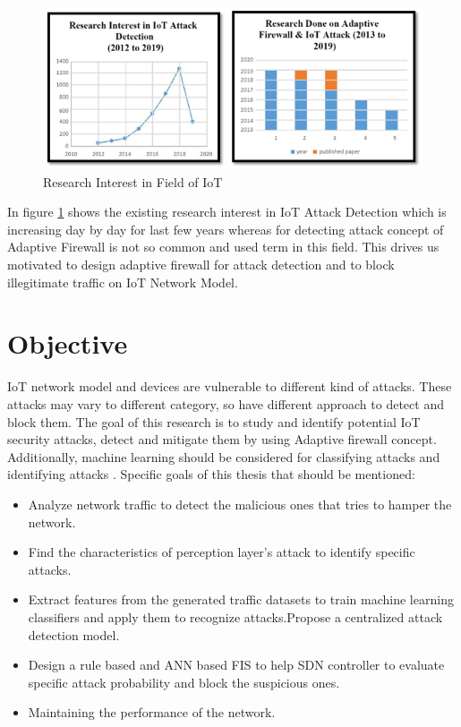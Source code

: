 \begin{figure}
    \centering
    \includegraphics[scale=0.5]{Chap1/motivation.PNG}
    \caption{Research Interest in Field of IoT}
    \label{fig:motivation}
\end{figure}

 In figure \ref{fig:motivation} shows the existing research interest in IoT Attack Detection which is increasing day by day for last few years whereas for detecting attack concept of Adaptive Firewall is not so common and used term in this field. This drives us motivated to design adaptive firewall for attack detection and to block illegitimate traffic on IoT Network Model.
\section{Objective}
IoT network model and devices are vulnerable to different kind of attacks. These attacks may vary to different category, so have different approach to detect and block them. The goal of this research is to study and identify potential IoT security attacks, detect and mitigate them by using Adaptive firewall concept. Additionally, machine learning should be considered for classifying attacks and identifying attacks \cite{c4}.
Specific goals of this thesis that should be mentioned:

\begin{itemize}
    \item Analyze network traffic to detect the malicious ones that tries to hamper the network.
    \item Find the characteristics of perception layer’s attack to identify specific attacks.
    \item Extract features from the generated traffic datasets to train machine learning classifiers and apply them to recognize attacks.Propose a centralized attack detection model.
    \item Design a rule based and ANN based FIS to help SDN controller to evaluate specific attack probability and block the suspicious ones.
    \item Maintaining the performance of the network.
\end{itemize}

